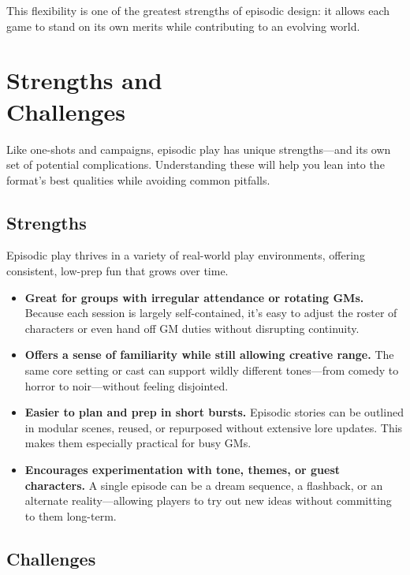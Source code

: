 This flexibility is one of the greatest strengths of episodic design: it allows each game to stand on its own merits while contributing to an evolving world.

\section[Strengths and Challenges]{Strengths and\\ Challenges}

Like one-shots and campaigns, episodic play has unique strengths—and its own set of potential complications. Understanding these will help you lean into the format’s best qualities while avoiding common pitfalls.

\subsection*{Strengths}

Episodic play thrives in a variety of real-world play environments, offering consistent, low-prep fun that grows over time.

\begin{itemize}
    \item \textbf{Great for groups with irregular attendance or rotating GMs.} Because each session is largely self-contained, it's easy to adjust the roster of characters or even hand off GM duties without disrupting continuity.

    \item \textbf{Offers a sense of familiarity while still allowing creative range.} The same core setting or cast can support wildly different tones—from comedy to horror to noir—without feeling disjointed.

    \item \textbf{Easier to plan and prep in short bursts.} Episodic stories can be outlined in modular scenes, reused, or repurposed without extensive lore updates. This makes them especially practical for busy GMs.

    \item \textbf{Encourages experimentation with tone, themes, or guest characters.} A single episode can be a dream sequence, a flashback, or an alternate reality—allowing players to try out new ideas without committing to them long-term.
\end{itemize}

\subsection*{Challenges}

